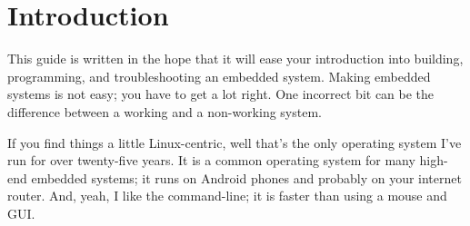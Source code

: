 \chapter{Introduction}

This guide is written in the hope that it will ease your introduction
into building, programming, and troubleshooting an embedded system.
Making embedded systems is not easy; you have to get a lot right.  One
incorrect bit can be the difference between a working and a
non-working system.

If you find things a little Linux-centric, well that's the only
operating system I've run for over twenty-five years.  It is a common
operating system for many high-end embedded systems; it runs on
Android phones and probably on your internet router.  And, yeah, I
like the command-line; it is faster than using a mouse and GUI.

